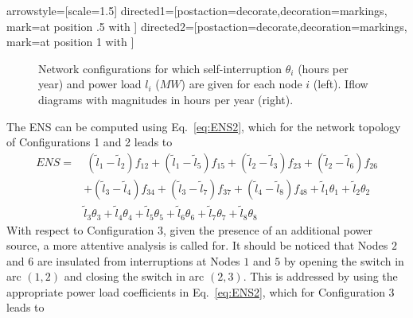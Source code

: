 \documentclass{article}
\begin{document}
\tikzstyle arrowstyle=[scale=1.5]
\tikzstyle directed1=[postaction={decorate,decoration={markings,
mark=at position .5 with {}}}]
\tikzstyle directed2=[postaction={decorate,decoration={markings,
mark=at position 1 with {}}}]

\begin{figure*}[hbtp]
\begin{center}
\end{center}
\begin{center}
\end{center}
\begin{center}
\end{center}
\caption{Network configurations for which self-interruption $\theta_i$ (hours per year) and power load $l_i$ ($MW$) are given for each node $i$ (left). Iflow diagrams with magnitudes in hours per year (right).}
\label{fig:billintonCaseE1}
\end{figure*}

The ENS can be computed using Eq.~\eqref{eq:ENS2}, which for the network topology of Configurations 1 and 2 leads to
\begin{align} 
	\displaystyle ENS =& \ (\tilde{l}_1-\tilde{l}_2)f_{12} + (\tilde{l}_1-\tilde{l}_5)f_{15} + (\tilde{l}_2-\tilde{l}_3)f_{23} + (\tilde{l}_2-\tilde{l}_6)f_{26} \nonumber \\
	&+ (\tilde{l}_3-\tilde{l}_4)f_{34} + (\tilde{l}_3-\tilde{l}_7)f_{37} + (\tilde{l}_4-\tilde{l}_8)f_{48} + 
	\tilde{l}_1\theta_1 + \tilde{l}_2\theta_2 \nonumber \\
	&\tilde{l}_3\theta_3 + \tilde{l}_4\theta_4 + \tilde{l}_5\theta_5 + \tilde{l}_6\theta_6
	+ \tilde{l}_7\theta_7 + \tilde{l}_8\theta_8 
	\label{eq:example}
\end{align}	
With respect to Configuration 3, given the presence of an additional power source, a more attentive analysis is called for. 
It should be noticed that Nodes $2$ and $6$ are insulated from interruptions at Nodes $1$ and $5$ by opening the switch in arc $(1,2)$ and closing the switch in arc $(2,3)$. This is addressed by using the appropriate power load coefficients in Eq.~\eqref{eq:ENS2}, which for Configuration 3 leads to
\end{document}
